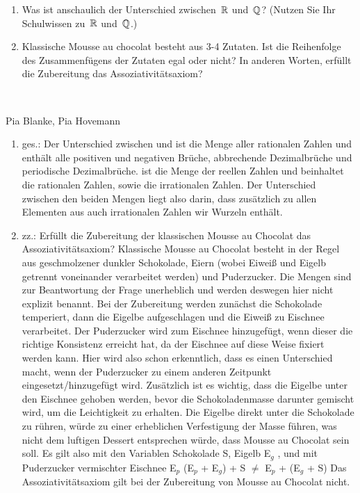 \begin{aufg}[4 Punkte]
\begin{enumerate}[label=$\mathrm{(\roman*)}$, ref=$\mathrm{\roman*}$]
\item Was ist anschaulich der Unterschied zwischen~$\mathbb{R}$ und~$\mathbb{Q}$? (Nutzen Sie Ihr Schulwissen zu~$\mathbb{R}$ und~$\mathbb{Q}$.)
\item Klassische Mousse au chocolat besteht aus 3-4 Zutaten. Ist die Reihenfolge des Zusammenf\"ugens der Zutaten egal oder nicht? In anderen Worten, erf\"ullt die Zubereitung das Assoziativit\"atsaxiom?
\end{enumerate}
\end{aufg}
 
\bigskip

\begin{lsg}\mbox{ }
\item [Pia Blanke, Pia Hovemann]
\begin{enumerate}[label=$\mathrm{(\roman*)}$, ref=$\mathrm{\roman*}$]
\item ges.: Der Unterschied zwischen \R und \Q
\Q  ist die Menge aller rationalen Zahlen und enthält alle positiven und negativen Brüche, abbrechende Dezimalbrüche und periodische Dezimalbrüche.
\R ist die Menge der reellen Zahlen und beinhaltet die rationalen Zahlen, sowie die irrationalen Zahlen.
Der Unterschied zwischen den beiden Mengen liegt also darin, dass \R zusätzlich zu allen Elementen aus \Q auch irrationalen Zahlen wir Wurzeln enthält.
%
\item zz.: Erfüllt die Zubereitung der klassischen Mousse au Chocolat das Assoziativitätsaxiom?
Klassische Mousse au Chocolat besteht in der Regel aus geschmolzener dunkler Schokolade, Eiern (wobei Eiweiß und Eigelb getrennt voneinander verarbeitet werden) und Puderzucker. Die Mengen sind zur Beantwortung der Frage unerheblich und werden deswegen hier nicht explizit benannt.
Bei der Zubereitung werden zunächst die Schokolade temperiert, dann die Eigelbe aufgeschlagen und die Eiweiß zu Eischnee verarbeitet. Der Puderzucker wird zum Eischnee hinzugefügt, wenn dieser die richtige Konsistenz erreicht hat, da der Eischnee auf diese Weise fixiert werden kann. Hier wird also schon erkenntlich, dass es einen Unterschied macht, wenn der Puderzucker zu einem anderen Zeitpunkt eingesetzt/hinzugefügt wird. 
Zusätzlich ist es wichtig, dass die Eigelbe unter den Eischnee gehoben werden, bevor die Schokoladenmasse darunter gemischt wird, um die Leichtigkeit zu erhalten. Die Eigelbe direkt unter die Schokolade zu rühren, würde zu einer erheblichen Verfestigung der Masse führen, was nicht dem luftigen Dessert entsprechen würde, dass Mousse au Chocolat sein soll.
Es gilt also mit den Variablen Schokolade \coloneqq S, Eigelb \coloneqq E$_{g}$ , und mit Puderzucker vermischter Eischnee \coloneqq E$_{p}$
(E$_{p}$ + E$_{g}$) + S $\neq$ E$_{p}$ + (E$_{g}$ + S)
Das Assoziativitätsaxiom gilt bei der Zubereitung von Mousse au Chocolat nicht.
\end{enumerate}
\end{lsg}
